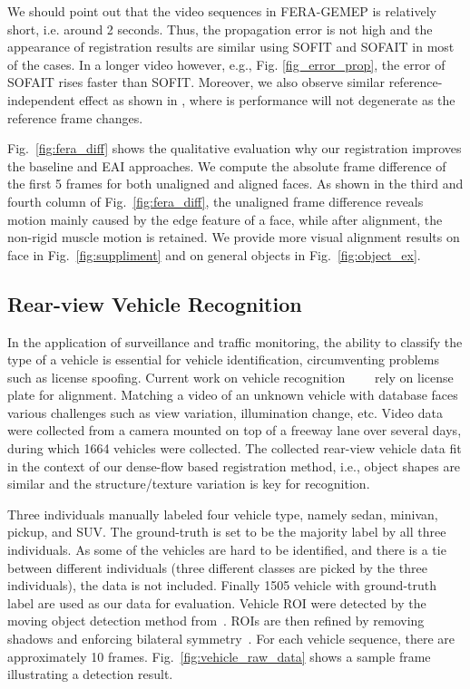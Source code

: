 \documentclass[10pt,journal]{IEEEtran}
\begin{document}
We should point out that the video sequences in FERA-GEMEP is relatively short, i.e. around 2 seconds. Thus, the propagation error is not high and the appearance of registration results are similar using SOFIT and SOFAIT in most of the cases. In a longer video however, e.g., Fig. \ref{fig_error_prop}, the error of SOFAIT rises faster than SOFIT. Moreover, we also observe similar reference-independent effect as shown in \cite{Yang_FG13}, where is performance will not degenerate as the reference frame changes. 

Fig.~\ref{fig:fera_diff} shows the qualitative evaluation why our registration improves the baseline and EAI approaches. We compute the absolute frame difference of the first 5 frames for both unaligned and aligned faces. As shown in the third and fourth column of Fig.~\ref{fig:fera_diff}, the unaligned frame difference reveals motion mainly caused by the edge feature of a face, while after alignment, the non-rigid muscle motion is retained. We provide more visual alignment results on face in Fig.~\ref{fig:suppliment} and on general objects in Fig.~\ref{fig:object_ex}.



\subsection{Rear-view Vehicle Recognition}


In the application of surveillance and traffic monitoring, the ability to classify the type of a vehicle is essential for vehicle identification, circumventing problems such as license spoofing. Current work on vehicle recognition~\cite{Petrovic04}~\cite{Negri06}~\cite{Zafar09}~\cite{Pearce11} rely on license plate for alignment. Matching a video of an unknown vehicle with database faces various challenges such as view variation, illumination change, etc. Video data were collected from a camera mounted on top of a freeway lane over several days, during which 1664 vehicles were collected. The collected rear-view vehicle data fit in the context of our dense-flow based registration method, i.e., object shapes are similar and the structure/texture variation is key for recognition. 

Three individuals manually labeled four vehicle type, namely sedan, minivan, pickup, and SUV. The ground-truth is set to be the majority label by all three individuals. As some of the vehicles are hard to be identified, and there is a tie between different individuals (three different classes are picked by the three individuals), the data is not included. Finally 1505 vehicle with ground-truth label are used as our data for evaluation. Vehicle ROI were detected by the moving object detection method from~\cite{Thakoor05}. ROIs are then refined by removing shadows and enforcing bilateral symmetry~\cite{Thakoor13}. For each vehicle sequence, there are approximately 10 frames. Fig.~\ref{fig:vehicle_raw_data} shows a sample frame illustrating a detection result.  
\end{document}
